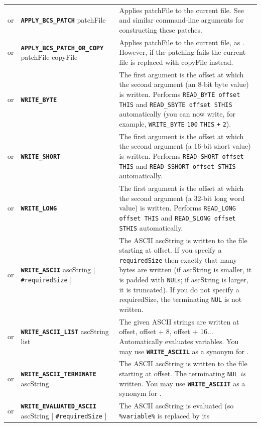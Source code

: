 \documentclass{article}
\def\ttref#1{\ahrefloc{#1}{\tt #1}}
\def\DEFINE#1{{\tt \bf #1}\label{#1}\index{#1}}
\def\t#1{{\tt #1}}
\def\Slist{{\color{red} list }}
\def\Ob{{\color{red} [ }}
\def\Oe{{\color{red} ] }}
\begin{document}
\begin{tabular}{cp{10in}|p{10in}}
or & \DEFINE{APPLY_BCS_PATCH} patchFile &
  Applies patchFile to the current file. See \ttref{--bcmp-from} and similar
  command-line arguments for constructing these patches. \\
or & \DEFINE{APPLY_BCS_PATCH_OR_COPY} patchFile copyFile &
  Applies patchFile to the current file, as \ttref{APPLY_BCS_PATCH}.
  However, if the patching fails the current file is replaced with copyFile
  instead. \\
or & \DEFINE{WRITE_BYTE} \ttref{offset} \ttref{value} &
  The first argument is the offset at which the second argument (an 8-bit
  byte value) is written. Performs \verb+READ_BYTE offset THIS+ and
  \verb+READ_SBYTE offset STHIS+ automatically (you can now write, for example,
  \verb+WRITE_BYTE+ \verb+100+ \verb+THIS+ \t{+} \verb+2+).  \\
or & \DEFINE{WRITE_SHORT} \ttref{offset} \ttref{value} &
  The first argument is the offset at which the second argument (a 16-bit
  short value) is written. Performs \verb+READ_SHORT offset THIS+ and
  \verb+READ_SSHORT offset STHIS+ automatically. \\
or & \DEFINE{WRITE_LONG} \ttref{offset} \ttref{value} &
  The first argument is the offset at which the second argument (a 32-bit
  long word value) is written. Performs \verb+READ_LONG offset THIS+ and
  \verb+READ_SLONG offset STHIS+ automatically. \\
or & \DEFINE{WRITE_ASCII} \ttref{offset} ascString
    \Ob \t{\#requiredSize} \Oe &
  The ASCII ascString is written to the file starting at offset.
  If you specify a \t{requiredSize} then exactly that many bytes are
  written (if ascString is smaller, it is padded with \t{NUL}s; if
  ascString is larger, it is truncated). If you do not specify a requiredSize,
  the terminating \t{NUL} is not written. \\
or & \DEFINE{WRITE_ASCII_LIST} \ttref{offset} ascString \Slist &
  The given ASCII strings are written at offset, offset + 8, offset + 16...
  Automatically evaluates variables. You may use \DEFINE{WRITE_ASCIIL}
  as a synonym for \ttref{WRITE_ASCII_LIST}.\\
or & \DEFINE{WRITE_ASCII_TERMINATE} \ttref{offset} ascString &
  The ASCII ascString is written to the file starting at offset.
  The terminating \t{NUL} \emph{is} written. You may use
  \DEFINE{WRITE_ASCIIT} as a synonym for \ttref{WRITE_ASCII_TERMINATE}. \\
or & \DEFINE{WRITE_EVALUATED_ASCII} \ttref{offset} ascString
    \Ob \t{\#requiredSize} \Oe &
  The ASCII ascString is evaluated (so \t{\%variable\%} is replaced by its

\end{tabular}
\end{document}
